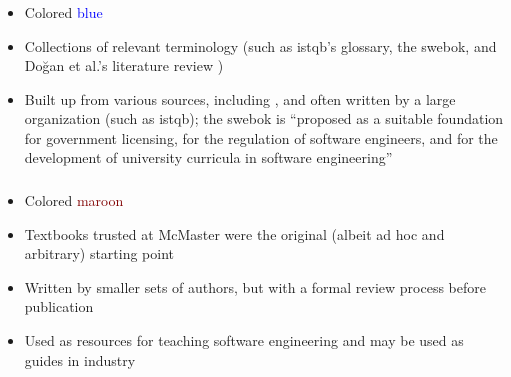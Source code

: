\subsubsection{}
\label{metas}
\begin{itemize}
    \item Colored \textcolor{blue}{blue}
    \item Collections of relevant terminology (such as \acs{istqb}'s glossary,
          the \acs{swebok}, and \ifnotpaper \citeauthor{DoğanEtAl2014}\else
              Doğan et al.\fi's literature review \citeyearpar{DoğanEtAl2014})
    \item Built up from various sources, including \stds{}, and often written
          by a large organization (such as \acs{istqb}); the \acs{swebok} is
          ``proposed as a suitable foundation for government licensing, for the
          regulation of software engineers, and for the development of
          university curricula in software engineering''
          \citep[p.~xix]{KanerEtAl2011}
\end{itemize}

\subsubsection{}
\label{texts}
\begin{itemize}
    \item Colored \textcolor{Maroon}{maroon}
    \item Textbooks trusted at McMaster \citep{Patton2006, PetersAndPedrycz2000,
              vanVliet2000} were the original (albeit ad hoc and arbitrary)
          starting point
    \item Written by smaller sets of authors, but with a formal review process
          before publication
    \item Used as resources for teaching software engineering and may be used
          as guides in industry
\end{itemize}

